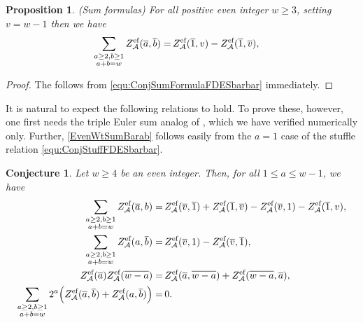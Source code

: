 \documentclass{article}
\newcommand{\calA}{\mathcal{A}}
\newcommand{\eff}{\text{\rm{ef}}}
\newcommand{\ol}{\overline}
\theoremstyle{plain}
\newtheorem{conj}[thm]{Conjecture}
\newtheorem{prop}[thm]{Proposition}
\theoremstyle{definition}
\begin{document}
\begin{prop}\label{prop:SumFormulaBarab}   \emph{(Sum formulas})
For all positive even integer $w\ge 3$, setting $v=w-1$ then we have
\begin{align}
  \sum_{\substack{a\ge 2,b\ge 1\\ a+b=w}}  Z_\calA^\eff(\ol{a},\ol{b})=&\,  Z_\calA^\eff(\ol{1},v)- Z_\calA^\eff(\ol{1},\ol{v}), \label{EvenWtSumBaraBarb}
\end{align}
\end{prop}

\begin{proof}
The follows from \eqref{equ:ConjSumFormulaFDESbarbar} immediately.
\end{proof}

It is natural to expect the following relations to hold. To prove these, however, one first needs the triple Euler sum analog of \cite[Cor.~5.9]{BachmannRisan2026}, which we have verified numerically only. Further, \eqref{EvenWtSumBarab} follows easily from the $a=1$ case of the stuffle relation \eqref{equ:ConjStuffFDESbarbar}.

\begin{conj}
Let $w\ge 4$ be an even integer. Then, for all $1\le a\le w-1$, we have
\begin{align}
  \sum_{\substack{a\ge 2,b\ge 1\\ a+b=w}}  Z_\calA^\eff(\ol{a},b)=&\,  Z_\calA^\eff(\ol{v},\ol{1})+ Z_\calA^\eff(\ol{1},\ol{v})-Z_\calA^\eff(\ol{v},1)-Z_\calA^\eff(\ol{1},v), \label{EvenWtSumBarab}\\
  \sum_{\substack{a\ge 2,b\ge 1\\ a+b=w}}  Z_\calA^\eff(a,\ol{b})=&\, Z_\calA^\eff(\ol{v},1)-Z_\calA^\eff(\ol{v},\ol{1}),\\
Z_\calA^\eff(\ol{a})Z_\calA^\eff(\ol{w-a})=&\, Z_\calA^\eff(\ol{a},\ol{w-a})+ Z_\calA^\eff(\ol{w-a},\ol{a}),\label{equ:ConjStuffFDESbarbar}\\
\sum_{\substack{a\ge 2,b\ge 1\\ a+b=w}}  2^a \Big(Z_\calA^\eff(\ol{a},\ol{b})+ Z_\calA^\eff(a,\ol{b})\Big)=&\, 0. \label{equ:EvenWtSum(a,barb)AND(a,barb)}
\end{align}
\end{conj}
\end{document}
